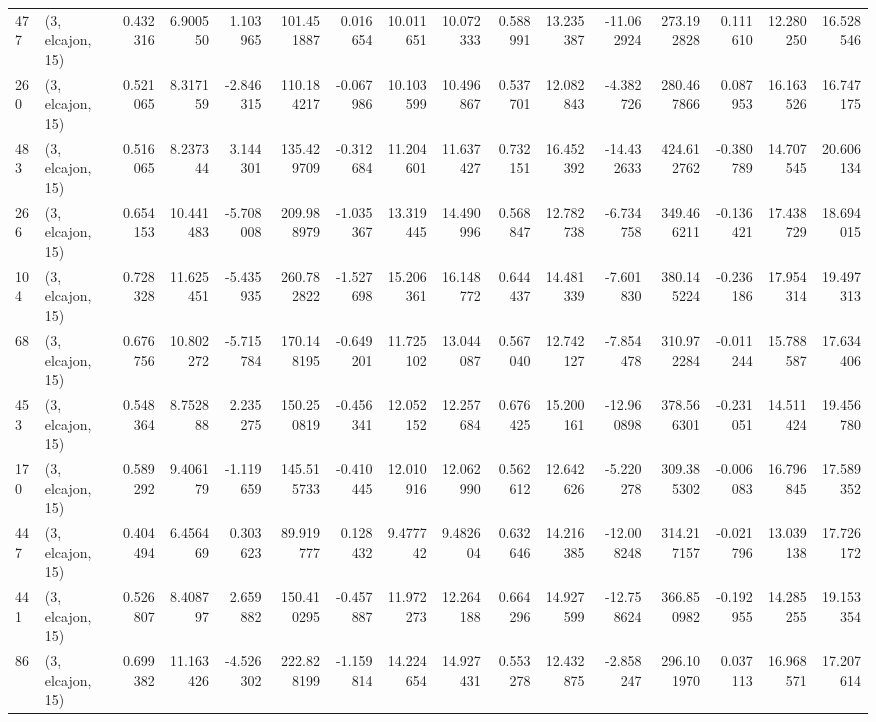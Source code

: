 \begin{tabular}{llrrrrrrrrrrrrrr}
477 &  (3, elcajon, 15) &   0.432316 &   6.900550 &   1.103965 &   101.451887 &   0.016654 &  10.011651 &  10.072333 &  0.588991 &  13.235387 & -11.062924 &   273.192828 &  0.111610 &  12.280250 &  16.528546 \\
260 &  (3, elcajon, 15) &   0.521065 &   8.317159 &  -2.846315 &   110.184217 &  -0.067986 &  10.103599 &  10.496867 &  0.537701 &  12.082843 &  -4.382726 &   280.467866 &  0.087953 &  16.163526 &  16.747175 \\
483 &  (3, elcajon, 15) &   0.516065 &   8.237344 &   3.144301 &   135.429709 &  -0.312684 &  11.204601 &  11.637427 &  0.732151 &  16.452392 & -14.432633 &   424.612762 & -0.380789 &  14.707545 &  20.606134 \\
266 &  (3, elcajon, 15) &   0.654153 &  10.441483 &  -5.708008 &   209.988979 &  -1.035367 &  13.319445 &  14.490996 &  0.568847 &  12.782738 &  -6.734758 &   349.466211 & -0.136421 &  17.438729 &  18.694015 \\
104 &  (3, elcajon, 15) &   0.728328 &  11.625451 &  -5.435935 &   260.782822 &  -1.527698 &  15.206361 &  16.148772 &  0.644437 &  14.481339 &  -7.601830 &   380.145224 & -0.236186 &  17.954314 &  19.497313 \\
68  &  (3, elcajon, 15) &   0.676756 &  10.802272 &  -5.715784 &   170.148195 &  -0.649201 &  11.725102 &  13.044087 &  0.567040 &  12.742127 &  -7.854478 &   310.972284 & -0.011244 &  15.788587 &  17.634406 \\
453 &  (3, elcajon, 15) &   0.548364 &   8.752888 &   2.235275 &   150.250819 &  -0.456341 &  12.052152 &  12.257684 &  0.676425 &  15.200161 & -12.960898 &   378.566301 & -0.231051 &  14.511424 &  19.456780 \\
170 &  (3, elcajon, 15) &   0.589292 &   9.406179 &  -1.119659 &   145.515733 &  -0.410445 &  12.010916 &  12.062990 &  0.562612 &  12.642626 &  -5.220278 &   309.385302 & -0.006083 &  16.796845 &  17.589352 \\
447 &  (3, elcajon, 15) &   0.404494 &   6.456469 &   0.303623 &    89.919777 &   0.128432 &   9.477742 &   9.482604 &  0.632646 &  14.216385 & -12.008248 &   314.217157 & -0.021796 &  13.039138 &  17.726172 \\
441 &  (3, elcajon, 15) &   0.526807 &   8.408797 &   2.659882 &   150.410295 &  -0.457887 &  11.972273 &  12.264188 &  0.664296 &  14.927599 & -12.758624 &   366.850982 & -0.192955 &  14.285255 &  19.153354 \\
86  &  (3, elcajon, 15) &   0.699382 &  11.163426 &  -4.526302 &   222.828199 &  -1.159814 &  14.224654 &  14.927431 &  0.553278 &  12.432875 &  -2.858247 &   296.101970 &  0.037113 &  16.968571 &  17.207614 \\

\end{tabular}
